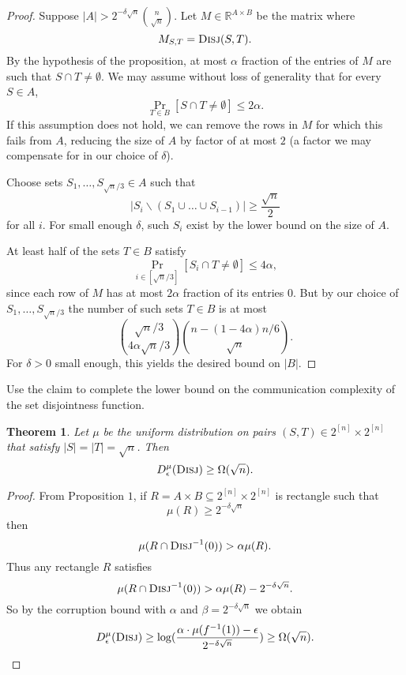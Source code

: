 \documentclass[11pt]{amsart}
\theoremstyle{plain}
\newtheorem{theorem}{Theorem}
\theoremstyle{definition}
\theoremstyle{plain}
\newcommand{\Disj}{\textsc{Disj}}
\newcommand{\R}{\mathbb{R}}
\begin{document}
\begin{proof}
Suppose $|A| > 2^{-\delta\sqrt{n}}{n\choose\sqrt{n}}.$ Let $M \in \R^{A\times B}$ be the matrix where
$$M_{S,T} = \Disj(S,T).$$
By the hypothesis of the proposition, at most $\alpha$ fraction of the entries of $M$ are such that $S\cap T \neq \emptyset$. We may assume without loss of generality that for every $S\in A$,
$$\Pr_{T \in B}[S\cap T \neq \emptyset] \leq 2\alpha.$$
If this assumption does not hold, we can remove the rows in $M$ for which this fails from $A$, reducing the size of $A$ by factor of at most $2$ (a factor we may compensate for in our choice of $\delta$).

Choose sets $S_1,\dots, S_{\sqrt{n}/3} \in A$ such that
$$|S_i\backslash (S_1\cup\dots\cup S_{i-1})| \geq \frac{\sqrt{n}}{2}$$
for all $i$. For small enough $\delta$, such $S_i$ exist by the lower bound on the size of $A$.

At least half of the sets $T \in B$ satisfy 
$$\Pr_{i \in [\sqrt{n}/3]}[ S_i\cap T \neq \emptyset] \leq 4\alpha,$$
since each row of $M$ has at most $2\alpha$ fraction of its entries $0$. But by our choice of $S_1,\dots, S_{\sqrt{n}/3}$ the number of such sets $T \in B$ is at most
$${\sqrt{n}/3\choose 4\alpha\sqrt{n}/3}{n-(1-4\alpha)n/6\choose \sqrt{n}}.$$
For $\delta>0$ small enough, this yields the desired bound on $|B|$.
\end{proof}

Use the claim to complete the lower bound on the communication complexity of the set disjointness function.

\begin{theorem}
Let $\mu$ be the uniform distribution on pairs $(S,T) \in 2^{[n]} \times 2^{[n]}$ that satisfy $|S| = |T| = \sqrt{n}$. Then
\[
D_\epsilon^{\mu}(\textsc{Disj}) \ge \Omega(\sqrt{n}).
\]
\end{theorem}

\begin{proof}
From Proposition $1$, if $R = A\times B \subseteq 2^{[n]}\times 2^{[n]}$ is rectangle such that
$$\mu(R) \geq 2^{-\delta\sqrt{n}}$$ then
$$\mu(R\cap \Disj^{-1}(0)) > \alpha \mu(R).$$	
Thus any rectangle $R$ satisfies
$$\mu(R\cap \Disj^{-1}(0)) > \alpha \mu(R) - 2^{-\delta\sqrt{n}}.$$
So by the corruption bound with $\alpha$ and $\beta = 2^{-\delta\sqrt{n}}$ we obtain
$$D^{\mu}_\epsilon(\Disj) \geq \log(\frac{\alpha\cdot \mu(f^{-1}(1)) - \epsilon}{2^{-\delta\sqrt{n}}}) \geq \Omega(\sqrt{n}).$$\end{proof}
\end{document}

